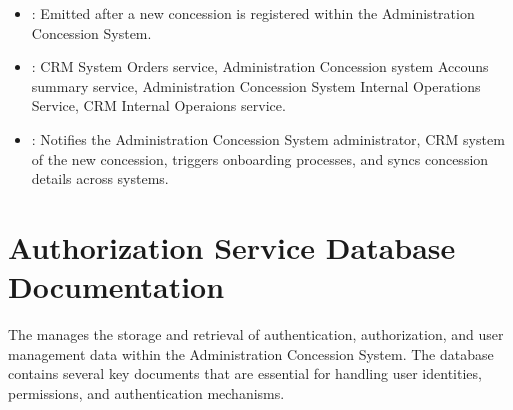 \documentclass[letterpaper,10pt,english]{sphinxmanual}
\begin{document}
\sphinxAtStartPar
{}
\begin{itemize}
\item {} 
\sphinxAtStartPar
{}: Emitted after a new concession is registered within the Administration Concession System.

\item {} 
\sphinxAtStartPar
{}: CRM System Orders service, Administration Concession system Accouns summary service, Administration Concession System Internal Operations Service, CRM Internal Operaions service.

\item {} 
\sphinxAtStartPar
{}: Notifies the Administration Concession System administrator, CRM system of the new concession, triggers onboarding processes, and syncs concession details across systems.

\end{itemize}


\section{Authorization Service Database Documentation}
\label{\detokenize{crm_system/authorization_service:authorization-service-database-documentation}}
\sphinxAtStartPar
The  manages the storage and retrieval of authentication, authorization, and user management data within the Administration Concession System. The database contains several key documents that are essential for handling user identities, permissions, and authentication mechanisms.
\end{document}

